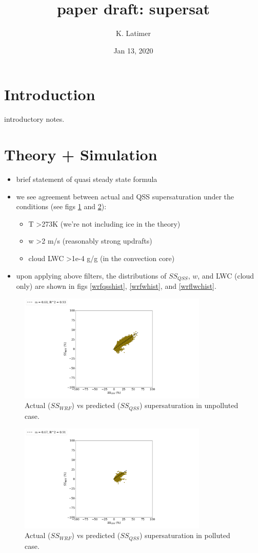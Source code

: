 \documentclass{article}
\title{paper draft: supersat}
\author{K. Latimer}
\date{Jan 13, 2020}
\begin{document}
\maketitle


\section{Introduction}
introductory notes.
\section{Theory + Simulation}
\begin{itemize}
	\item brief statement of quasi steady state formula 
	\item we see agreement between actual and QSS supersaturation under the conditions (see figs \ref{wrfvsqssunpoll} and \ref{wrfvsqsspoll}):
	\begin{itemize}
		\item T \textgreater 273K (we're not including ice in the theory)
		\item w \textgreater 2 m/s (reasonably strong updrafts)
		\item cloud LWC \textgreater 1e-4 g/g (in the convection core)
	\end{itemize}
	\item upon applying above filters, the distributions of $SS_{QSS}$, $w$, and LWC (cloud only) are shown in figs \ref{wrfqsshist}, \ref{wrfwhist}, and \ref{wrflwchist}.
\end{itemize}
\begin{figure}[ht]
    \centering
    \includegraphics[width=9cm]{mywrf/v28_inclrain_and_vent_qss_vs_fan_Unpolluted_figure.png}
    \caption{Actual ($SS_{WRF}$) vs predicted ($SS_{QSS}$) supersaturation in unpolluted case.}
    \label{wrfvsqssunpoll}
\end{figure}
\begin{figure}[ht]
    \centering
    \includegraphics[width=9cm]{mywrf/v28_inclrain_and_vent_qss_vs_fan_Polluted_figure.png}
    \caption{Actual ($SS_{WRF}$) vs predicted ($SS_{QSS}$) supersaturation in polluted case.}
    \label{wrfvsqsspoll}
\end{figure}
\end{document}
